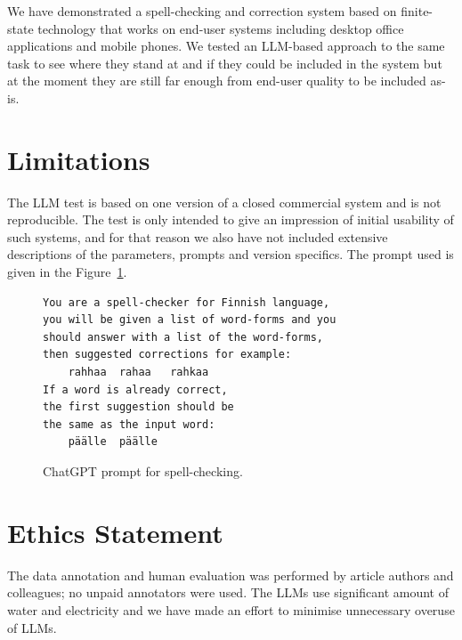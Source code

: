 \documentclass[free]{flammie}
\begin{document}
We have demonstrated a spell-checking and correction system based on
finite-state technology that works on end-user systems including desktop office
applications and mobile phones.  We tested an LLM-based approach to the same
task to see where they stand at and if they could be included in the system but
at the moment they are still far enough from end-user quality to be included
as-is.

\section*{Limitations}

The LLM test is based on one version of a closed commercial system and is not
reproducible. The test is only intended to give an impression of initial
usability of such systems, and for that reason we also have not included
extensive descriptions of the parameters, prompts and version specifics.  The
prompt used is given in the Figure~\ref{fig:prompt}.

\begin{figure}
\scriptsize
    \begin{verbatim}
You are a spell-checker for Finnish language,
you will be given a list of word-forms and you
should answer with a list of the word-forms,
then suggested corrections for example:
    rahhaa	rahaa	rahkaa
If a word is already correct,
the first suggestion should be
the same as the input word:
    päälle	päälle
    \end{verbatim}
    \caption{ChatGPT prompt for spell-checking.\label{fig:prompt}}
\end{figure}

\section*{Ethics Statement}

The data annotation and human evaluation was performed by article authors and
colleagues; no unpaid annotators were used.  The LLMs use significant amount of
water and electricity and we have made an effort to minimise unnecessary overuse
of LLMs.










\end{document}

